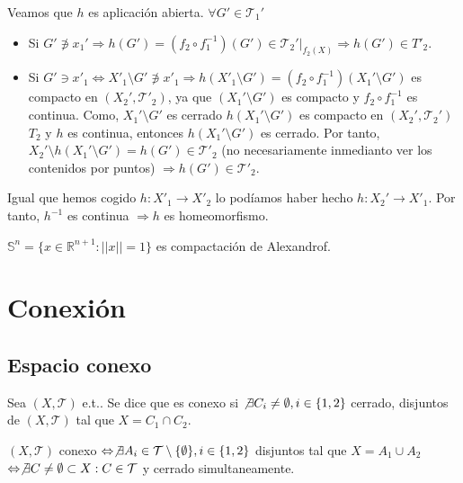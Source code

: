 \begin{dem}
\begin{enumerate}[label=(\roman*)]
      Veamos que $h$ es aplicación abierta. $\forall G' \in \mathcal{T}_{1}'$
      \begin{itemize}
        \item Si $G' \not \ni x_{1}' \Rightarrow h(G') = (f_{2} \circ f_{1}^{-1})(G') \in \mathcal{T}_{2}'|_{f_{2}(X)} \Rightarrow h(G') \in T'_{2}$.
        \item Si $G' \ni x'_{1} \Leftrightarrow X'_{1} \setminus G' \not \ni x'_{1} \Rightarrow h(X'_{1} \setminus G') = (f_{2} \circ f_{1}^{-1}) (X_{1}' \setminus G')$ es compacto en $(X_{2}', \mathcal{T}'_{2})$, ya que $(X_{1}' \setminus G')$ es compacto y $f_{2} \circ f_{1}^{-1}$ es continua. Como, $X_{1}' \setminus G'$ es cerrado $h(X_{1}' \setminus G')$ es compacto en $( X_{2}', \mathcal{T}_{2}' )$ $T_{2}$ y $h$ es continua, entonces $h(X_{1}' \setminus G')$ es cerrado. Por tanto, $X_{2}' \setminus h(X_{1}' \setminus G') = h(G') \in \mathcal{T}'_{2}$ (no necesariamente inmedianto ver los contenidos por puntos) $\Rightarrow h(G') \in \mathcal{T}'_{2}$.
      \end{itemize}
      Igual que hemos cogido $h : X'_{1} \to X'_{2}$ lo podíamos haber hecho $h : X_{2}' \to X'_{1}$. Por tanto, $h^{-1}$ es continua $\Rightarrow h$ es homeomorfismo.
  \end{enumerate}
\end{dem}

\begin{ejm}
  $\mathbb{S}^{n} = \{ x \in \mathbb{R}^{n+1} : ||x|| = 1 \}$ es compactación de Alexandrof.
\end{ejm}

\chapter{Conexión}

\section{Espacio conexo}

\begin{defn}[Conexo]
  Sea $( X, \mathcal{T} )$ e.t.. Se dice que es conexo si $\not \exists C_{i} \neq \emptyset, i \in \{ 1, 2 \}$ cerrado, disjuntos de $( X, \mathcal{T} )$ tal que $X = C_{1} \cap C_{2}$.
\end{defn}

\begin{obs}
  $( X, \mathcal{T} )$ conexo $\Leftrightarrow \not \exists A_{i} \in \mathcal{T} \setminus \{ \emptyset \}, i \in \{ 1, 2 \} $ disjuntos tal que $X = A_{1} \cup A_{2}$ $\Leftrightarrow \not \exists C \neq \emptyset \subset X : C \in \mathcal{T}$ y cerrado simultaneamente.
\end{obs} 

